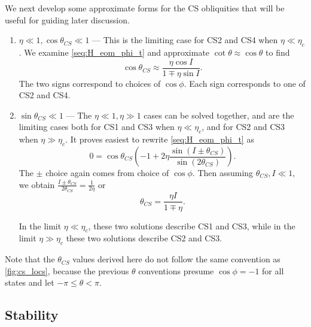 \documentclass[
        fleqn,
        usenatbib,
        referee,
    ]{mnras}
\newcommand*{\p}[1]{\left(#1\right)}
\begin{document}
We next develop some approximate forms for the CS obliquities that will be
useful for guiding later discussion.
\begin{enumerate}
    \item $\eta \ll 1, \cos \theta_{CS} \ll 1$ --- This is the limiting case for
        CS2 and CS4 when $\eta \ll \eta_c$. We examine \autoref{seq:H_eom_phi_t}
        and approximate $\cot \theta \approx \cos \theta$ to find
        \begin{equation}
            \cos \theta_{CS} \approx \frac{\eta \cos I}
                {1 \mp \eta \sin I}.
        \end{equation}
        The two signs correspond to choices of $\cos \phi$. Each sign
        corresponds to one of CS2 and CS4.

    \item $\sin \theta_{CS} \ll 1$ --- The $\eta \ll 1, \eta \gg 1$ cases can be
        solved together, and are the limiting cases both for CS1 and CS3 when
        $\eta \ll \eta_c$, and for CS2 and CS3 when $\eta \gg \eta_c$. It proves
        easiest to rewrite \autoref{seq:H_eom_phi_t} as
        \begin{equation}
            0 = \cos \theta_{CS}\p{-1 + 2\eta
                \frac{\sin \p{I \pm \theta_{CS}}}{\sin \p{2\theta_{CS}}}}.
                \label{eq:rewritten_dphi}
        \end{equation}
        The $\pm$ choice again comes from choice of $\cos \phi$. Then assuming
        $\theta_{CS}, I \ll 1$, we obtain $\frac{I \pm
        \theta_{CS}}{2\theta_{CS}} = \frac{1}{2\eta}$ or
        \begin{equation}
            \theta_{CS} = \frac{\eta I}{1 \mp \eta}.
        \end{equation}

        In the limit $\eta \ll \eta_c$, these two solutions describe CS1 and
        CS3, while in the limit $\eta \gg \eta_c$ these two solutions describe
        CS2 and CS3.
\end{enumerate}
Note that the $\theta_{CS}$ values derived here do not follow the same
convention as \autoref{fig:cs_locs}, because the previous $\theta$ conventions
presume $\cos \phi = -1$ for all states and let $-\pi \leq \theta < \pi$.

\subsection{Stability}
\end{document}

